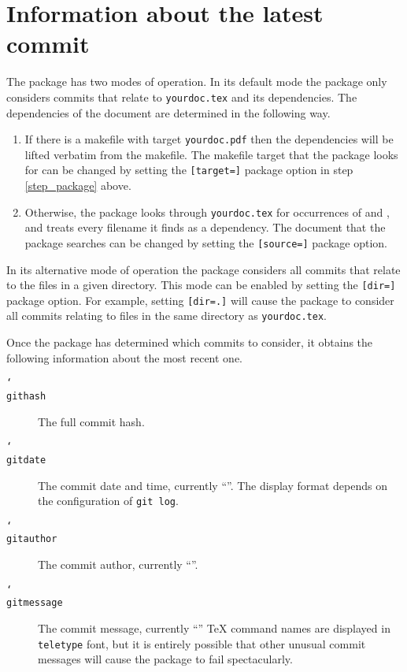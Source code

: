 \documentclass[12pt,a4paper]{article}
\begin{document}
	\section*{Information about the latest commit}
	The package has two modes of operation.
	In its default mode the package only considers commits that relate to
	\verb+yourdoc.tex+ and its dependencies.
	The dependencies of the document are determined in the following way.
	\begin{enumerate}
		\item
		If there is a makefile with target \verb+yourdoc.pdf+ then the dependencies
		will be lifted verbatim from the makefile. The makefile target that the
		package looks for can be changed by setting the \verb+[target=]+ package
		option in step \ref{step_package} above.
		\item
		Otherwise, the package looks through \verb+yourdoc.tex+ for occurrences
		of \verb++ and \verb++, and treats every
		filename it finds as a dependency.
		The document that the package searches can be changed by setting the
		\verb+[source=]+ package option.
	\end{enumerate}

	In its alternative mode of operation the package considers all commits that
	relate to the files in a given directory. This mode can be enabled by setting
	the \verb+[dir=]+ package option. For example, setting \verb+[dir=.]+ will
	cause the package to consider all commits relating to files in the same
	directory as \verb+yourdoc.tex+.

	Once the package has determined which commits to consider, it obtains the
	following information about the most recent one.
	\begin{description}
		\item[\texttt{\char`\\githash}]
		The full commit hash.
		\item[\texttt{\char`\\gitdate}]
		The commit date and time, currently ``\gitdate''. The display format depends
		on the configuration of \verb+git log+.
		\item[\texttt{\char`\\gitauthor}]
		The commit author, currently ``\gitauthor''.
		\item[\texttt{\char`\\gitmessage}]
		The commit message, currently ``\gitmessage'' \TeX{} command names are
		displayed in \texttt{teletype} font, but it is entirely possible that
		other unusual commit messages will cause the package to fail spectacularly.
	\end{description}
\end{document}
